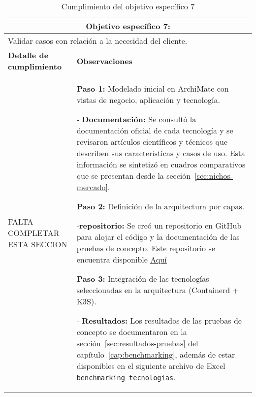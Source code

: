 \begin{table}[H]
\centering
\caption{Cumplimiento del objetivo específico 7}
\label{tab:cumplimiento-objetivo-7}
\begin{tabular}{|p{6cm}|p{9cm}|}
\hline
\multicolumn{2}{|c|}{\textbf{Objetivo específico 7:}} \\
\hline
\multicolumn{2}{|p{15cm}|}{Validar casos con relación a la necesidad del cliente.} \\
\hline
\textbf{Detalle de cumplimiento} & \textbf{Observaciones} \\
\hline
FALTA COMPLETAR ESTA SECCION &
\textbf{Paso 1:} Modelado inicial en ArchiMate con vistas de negocio, aplicación y tecnología.

- \textbf{Documentación:} Se consultó la documentación oficial de cada tecnología y se revisaron artículos científicos y técnicos que describen sus características y casos de uso. Esta información se sintetizó en cuadros comparativos que se presentan desde la sección~\textcolor{blue}{\ref{sec:nichos-mercado}}.

\textbf{Paso 2:} Definición de la arquitectura por capas.

-\textbf{repositorio:} Se creó un repositorio en GitHub para alojar el código y la documentación de las pruebas de concepto. Este repositorio se encuentra disponible \underline{\href{https://github.com/Anubis-1001/benchmark-tecnologias-de-contenerizacion} {Aquí}}

\textbf{Paso 3:} Integración de las tecnologías seleccionadas en la arquitectura (Containerd + K3S).

- \textbf{Resultados:} Los resultados de las pruebas de concepto se documentaron en la sección~\textcolor{blue}{\ref{sec:resultados-pruebas}} del capítulo~\textcolor{blue}{\ref{cap:benchmarking}}, además de estar disponibles en el siguiente archivo de Excel \underline{\href{https://docs.google.com/spreadsheets/d/1Ce37Sm3Swyfa88Ur1yQbLarq_D86obUIAGGJocgQbUE/edit?usp=sharing} {\texttt{benchmarking\_tecnologias}}}. \\

\hline
\end{tabular}
\end{table}
